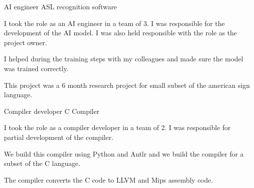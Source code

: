 \begin{cventries}
    \cventry
    {AI engineer} %
    {ASL recognition software} %
    {} 
    {}
    {
      \begin{cvitems} %
        \item {I took the role as an AI engineer in a team of 3. I was responsible for the development of the AI model. I was also held responsible with the role as the project owner.}
        \item {I helped during the training steps with my colleagues and made sure the model was trained correctly.}
        \item {This project was a 6 month research project for small subset of the american sign language.}
      \end{cvitems}
    }

    \cventry
    {Compiler developer} %
    {C Compiler} %
    {} 
    {}
    {
    \begin{cvitems} %
        \item {I took the role as a compiler developer in a team of 2. I was responsible for partial development of the compiler.}
        \item {We build this compiler using Python and Antlr and we build the compiler for a subset of the C language.}
        \item {The compiler converts the C code to LLVM and Mips assembly code.}
    \end{cvitems}
    }

\end{cventries}
